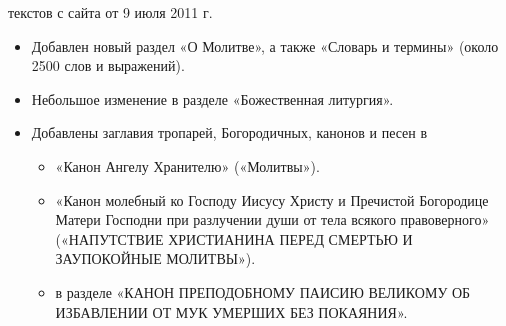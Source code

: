 
{ текстов с сайта от 9 июля 2011 г.

\begin{itemize}

\item Добавлен новый раздел «О Молитве», а также «Словарь и термины» (около 2500 слов и выражений).

\item Небольшое изменение в разделе «Божественная литургия».

\item Добавлены заглавия тропарей, Богородичных, канонов и песен в

\begin{itemize}

\item «Канон Ангелу Хранителю» («Молитвы»).

\item «Канон молебный ко Господу Иисусу Христу и Пречистой Богородице Матери Господни при разлучении души от тела всякого правоверного» («НАПУТСТВИЕ ХРИСТИАНИНА ПЕРЕД СМЕРТЬЮ И ЗАУПОКОЙНЫЕ МОЛИТВЫ»).

\item в разделе «КАНОН ПРЕПОДОБНОМУ ПАИСИЮ ВЕЛИКОМУ ОБ ИЗБАВЛЕНИИ ОТ МУК УМЕРШИХ БЕЗ ПОКАЯНИЯ».

\end{itemize}
\end{itemize}}


